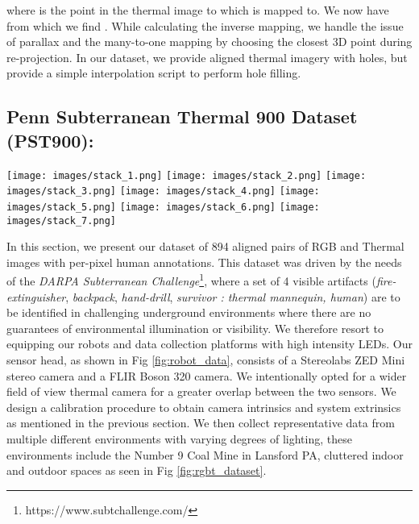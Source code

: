 \documentclass[letterpaper, 10 pt, conference]{ieeeconf}
\begin{document}
where  is the point in the thermal image to which  is mapped to. We now have  from which we find . While calculating the inverse mapping, we handle the issue of parallax and the many-to-one mapping by choosing the closest 3D point during re-projection. In our dataset, we provide aligned thermal imagery with holes, but provide a simple interpolation script to perform hole filling.



\subsection{Penn Subterranean Thermal 900 Dataset (PST900):}

\begin{figure*}[t!]
\begin{center}
\vspace{0.15cm}
\texttt{[image: images/stack\_1.png]}
\texttt{[image: images/stack\_2.png]}
\texttt{[image: images/stack\_3.png]}
\texttt{[image: images/stack\_4.png]}
\texttt{[image: images/stack\_5.png]}
\texttt{[image: images/stack\_6.png]}
\texttt{[image: images/stack\_7.png]}
\vspace{-0.25cm}
\end{center}
   \caption{PST900 Dataset: Examples from our proposed dataset; The \textit{first row} contains example RGB image data captured from the Stereolabs Zed Mini camera. The \textit{second row} contains aligned thermal imagery (visualized in 8-bit color) captured from the FLIR Boson camera. The \textit{last row} contains human annotated per-pixel labels for each of the four classes.}
\label{fig:rgbt_dataset}
\vspace{-0.45cm}
\end{figure*}

In this section, we present our dataset of 894 aligned pairs of RGB and Thermal images with per-pixel human annotations. This dataset was driven by the needs of the \textit{DARPA Subterranean Challenge}\footnote{https://www.subtchallenge.com/}, where a set of 4 visible artifacts (\textit{fire-extinguisher}, \textit{backpack}, \textit{hand-drill}, \textit{survivor : thermal mannequin, human}) are to be identified in challenging underground environments where there are no guarantees of environmental illumination or visibility. We therefore resort to equipping our robots and data collection platforms with high intensity LEDs. Our sensor head, as shown in Fig \ref{fig:robot_data}, consists of a Stereolabs ZED Mini stereo camera and a FLIR Boson 320 camera. We intentionally opted for a wider field of view thermal camera for a greater overlap between the two sensors. We design a calibration procedure to obtain camera intrinsics and system extrinsics as mentioned in the previous section. We then collect representative data from multiple different environments with varying degrees of lighting, these environments include the Number 9 Coal Mine in Lansford PA, cluttered indoor and outdoor spaces as seen in Fig \ref{fig:rgbt_dataset}. 
\end{document}
